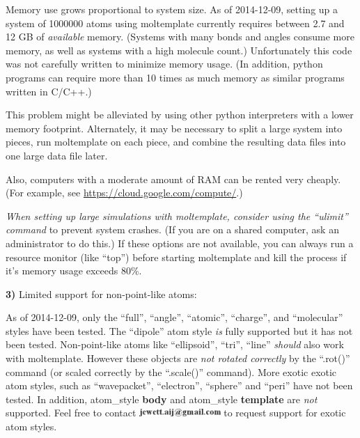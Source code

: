 \documentclass[11pt]{article}
\begin{document}
Memory use grows proportional to system size.
As of 2014-12-09, setting up a system of 1000000 atoms using moltemplate 
currently requires between 2.7 and 12 GB of \textit{available} memory. 
(Systems with many bonds and angles consume more memory, 
 as well as systems with a high molecule count.)
Unfortunately this code was not carefully written to minimize memory usage. 
(In addition, python programs can require more than 10 
times as much memory as similar programs written in C/C++.)

This problem might be alleviated by using other 
python interpreters with a lower memory footprint.
Alternately, it may be necessary to split a large system into pieces, 
run moltemplate on each piece, and combine the resulting data files 
into one large data file later.

Also, computers with a moderate amount of RAM can be rented very cheaply.
(For example, see \url{https://cloud.google.com/compute/}.)

\textit{When setting up large simulations with moltemplate,
consider using the \mbox{``ulimit''} command}
to prevent system crashes.
(If you are on a shared computer, ask an administrator to do this.)
If these options are not available,
you can always run a resource monitor (like ``top'') before 
starting moltemplate and kill the process if it's memory usage exceeds 80\%.


\textbf{3)} Limited support for non-point-like atoms:

As of 2014-12-09, only the ``full'', ``angle'', ``atomic'', ``charge'',
and ``molecular'' styles have been tested.  
The ``dipole'' atom style \textit{is} fully supported 
but it has not been tested.
Non-point-like atoms like ``ellipsoid'', ``tri'', ``line'' 
\textit{should} also work with moltemplate. 
However these objects
are \textit{not rotated correctly} 
by the ``.rot()'' command
(or scaled correctly by the ``.scale()'' command).
More exotic exotic atom styles, such as 
``wavepacket'', ``electron'', ``sphere'' and ``peri''
have not been tested.
In addition, atom\_style \textbf{body} and 
atom\_style \textbf{template} are \textit{not} 
supported.
Feel free to contact \includegraphics[height=0.3cm]{author_email.png}
to request support for exotic atom styles.
\end{document}
